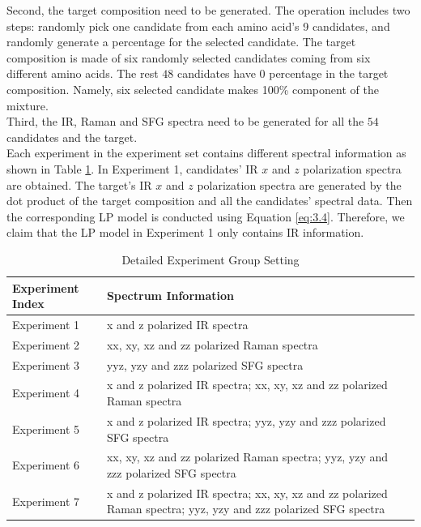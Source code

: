 Second, the target composition need to be generated. The operation includes two steps: randomly pick one candidate from each amino acid's 9 candidates, and randomly generate a percentage for the selected candidate. The target composition is made of six randomly selected candidates coming from six different amino acids. The rest $48$ candidates have $0$ percentage in the target composition. Namely, six selected candidate makes 100\% component of the mixture. \\

Third, the IR, Raman and SFG spectra need to be generated for all the $54$ candidates and the target. \\

Each experiment in the experiment set contains different spectral information as shown in Table \ref{tab:5.1}. In Experiment 1, candidates' IR $x$ and $z$ polarization spectra are obtained. The target's IR $x$ and $z$ polarization spectra are generated by the dot product of the target composition and all the candidates' spectral data. Then the corresponding LP model is conducted using Equation \ref{eq:3.4}. Therefore, we claim that the LP model in Experiment 1 only contains IR information.\\

\begin{table}\tiny 
\begin{center}
\begin{tabular}{| l | l | l  }
\hline
Experiment Index & Spectrum Information \\
\hline
Experiment 1 & x and z polarized IR spectra\\
\hline
Experiment 2 & xx, xy, xz and zz polarized Raman spectra \\
\hline
Experiment 3 & yyz, yzy and zzz polarized SFG spectra \\
\hline
Experiment 4 & x and z polarized IR spectra; xx, xy, xz and zz polarized Raman spectra \\
\hline
Experiment 5 & x and z polarized IR spectra; yyz, yzy and zzz polarized SFG spectra   \\
\hline
Experiment 6 & xx, xy, xz and zz polarized Raman spectra; yyz, yzy and zzz polarized SFG spectra \\
\hline
Experiment 7 & x and z polarized IR spectra; xx, xy, xz and zz polarized Raman spectra; yyz, yzy and zzz polarized SFG spectra \\
\hline
\end{tabular} 
\end{center}
\caption{Detailed Experiment Group Setting} 
\label{tab:5.1} 
\end{table}	

